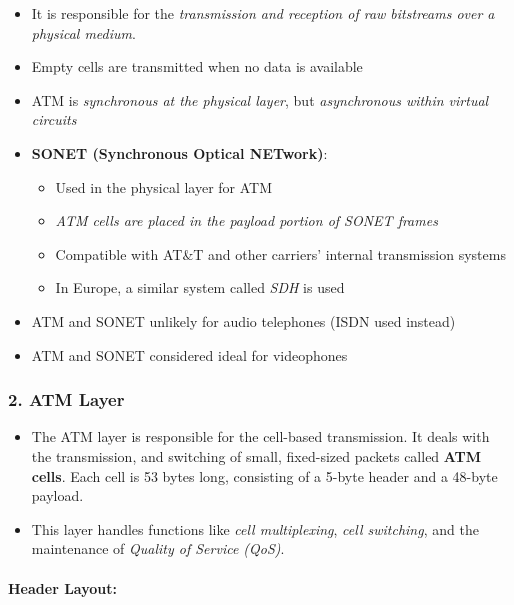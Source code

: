 \documentclass[
]{article}
\providecommand{\tightlist}{%
  \setlength{\itemsep}{0pt}\setlength{\parskip}{0pt}}
\begin{document}
\begin{itemize}
\tightlist
\item
  It is responsible for the \emph{transmission and reception of raw
  bitstreams over a physical medium}.
\item
  Empty cells are transmitted when no data is available
\item
  ATM is \emph{synchronous at the physical layer}, but
  \emph{asynchronous within virtual circuits}
\item
  \textbf{SONET (Synchronous Optical NETwork)}:

  \begin{itemize}
  \tightlist
  \item
    Used in the physical layer for ATM
  \item
    \emph{ATM cells are placed in the payload portion of SONET frames}
  \item
    Compatible with AT\&T and other carriers' internal transmission
    systems
  \item
    In Europe, a similar system called \emph{SDH} is used
  \end{itemize}
\item
  ATM and SONET unlikely for audio telephones (ISDN used instead)
\item
  ATM and SONET considered ideal for videophones
\end{itemize}

\hypertarget{atm-layer}{%
\subsubsection{2. ATM Layer}\label{atm-layer}}

\begin{itemize}
\tightlist
\item
  The ATM layer is responsible for the cell-based transmission. It deals
  with the transmission, and switching of small, fixed-sized packets
  called \textbf{ATM cells}. Each cell is 53 bytes long, consisting of a
  5-byte header and a 48-byte payload.
\item
  This layer handles functions like \emph{cell multiplexing}, \emph{cell
  switching}, and the maintenance of \emph{Quality of Service (QoS)}.
\end{itemize}

\hypertarget{header-layout}{%
\paragraph{Header Layout:}\label{header-layout}}
\end{document}
